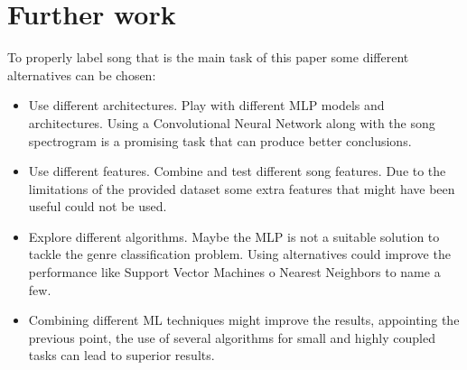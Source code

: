\section{Further work}
To properly label song that is the main task of this paper some different alternatives can be chosen:

\begin{itemize}
	\item Use different architectures. Play with different MLP models and architectures. Using a Convolutional Neural Network along with the song spectrogram is a promising task that can produce better conclusions.
	\item Use different features. Combine and test different song features. Due to the limitations of the provided dataset some extra features that might have been useful could not be used.
	\item Explore different algorithms. Maybe the MLP is not a suitable solution to tackle the genre classification problem. Using alternatives could improve the performance like Support Vector Machines o Nearest Neighbors to name a few.
	\item Combining different ML techniques might improve the results, appointing the previous point, the use of several algorithms for small and highly coupled tasks can lead to superior results.
\end{itemize}
